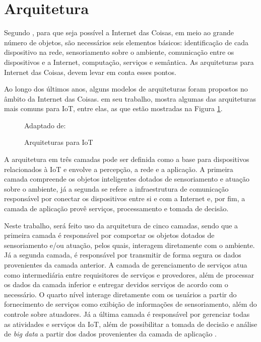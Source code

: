 \section{Arquitetura}

Segundo , para que seja possível a Internet das Coisas, em meio ao grande número de objetos, são necessários seis elementos básicos: identificação de cada dispositivo na rede, sensoriamento sobre o ambiente, comunicação entre os dispositivos e a Internet, computação, serviços e semântica. As arquiteturas para Internet das Coisas, devem levar em conta esses pontos.

Ao longo dos últimos anos, alguns modelos de arquiteturas foram propostos no âmbito da Internet das Coisas.  em seu trabalho, mostra algumas das arquiteturas mais comuns para IoT, entre elas, as que estão mostradas na Figura \ref{fig:cap2_arquiteturas}.
\begin{figure}[htb]
	\centering
	\caption{Arquiteturas para IoT}
	
	Adaptado de: 
	\label{fig:cap2_arquiteturas}
\end{figure}

A arquitetura em três camadas pode ser definida como a base para dispositivos relacionados à IoT e envolve a  percepção, a rede e a aplicação. A primeira camada compreende os objetos inteligentes dotados de sensoriamento e atuação sobre o ambiente, já a segunda se refere a infraestrutura de comunicação responsável por conectar os dispositivos entre si e com a Internet e, por fim, a camada de aplicação provê serviços, processamento e tomada de decisão.  

Neste trabalho, será feito uso da arquitetura de cinco camadas, sendo que a primeira camada é responsável por comportar os objetos dotados de sensoriamento e/ou atuação, pelos quais, interagem diretamente com o ambiente. Já a segunda camada, é responsável por transmitir de forma segura os dados provenientes da camada anterior. A camada de gerenciamento de serviços atua como intermediária entre requisitores de serviços e provedores, além de processar os dados da camada inferior e entregar devidos serviços de acordo com o necessário. O quarto nível interage diretamente com os usuários a partir do fornecimento de serviços como exibição de informações de sensoriamento, além do controle sobre atuadores. Já a última camada é responsável por gerenciar todas as atividades e serviços da IoT, além de possibilitar a tomada de decisão e análise de \textit{big data} a partir dos dados provenientes da camada de aplicação \cite{Al-Fuqaha2015}.

